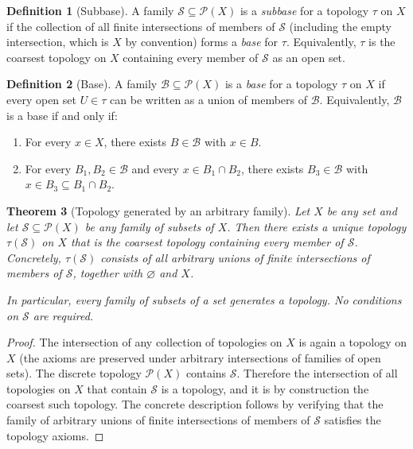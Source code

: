 \documentclass[11pt,a4paper]{article}
\theoremstyle{plain}
\newtheorem{theorem}{Theorem}[section]
\theoremstyle{definition}
\newtheorem{definition}[theorem]{Definition}
\newcommand{\powerset}{\mathcal{P}}
\newcommand{\subbase}{\mathcal{S}}
\newcommand{\base}{\mathcal{B}}
\begin{document}
\begin{definition}[Subbase]\label{def:subbase}
A family $\subbase \subseteq \powerset(X)$ is a \emph{subbase} for a topology
$\tau$ on $X$ if the collection of all finite intersections of members of
$\subbase$ (including the empty intersection, which is $X$ by convention)
forms a \emph{base} for $\tau$.  Equivalently, $\tau$ is the coarsest topology
on $X$ containing every member of $\subbase$ as an open set.
\end{definition}

\begin{definition}[Base]\label{def:base}
A family $\base \subseteq \powerset(X)$ is a \emph{base} for a topology $\tau$
on $X$ if every open set $U \in \tau$ can be written as a union of members of
$\base$.  Equivalently, $\base$ is a base if and only if:
\begin{enumerate}[label=(\roman*),nosep]
  \item For every $x \in X$, there exists $B \in \base$ with $x \in B$.
  \item For every $B_1, B_2 \in \base$ and every $x \in B_1 \cap B_2$, there
        exists $B_3 \in \base$ with $x \in B_3 \subseteq B_1 \cap B_2$.
\end{enumerate}
\end{definition}

\begin{theorem}[Topology generated by an arbitrary family]\label{thm:generated-topology}
Let $X$ be any set and let $\subbase \subseteq \powerset(X)$ be any family of
subsets of $X$.  Then there exists a unique topology $\tau(\subbase)$ on $X$
that is the coarsest topology containing every member of $\subbase$.
Concretely, $\tau(\subbase)$ consists of all arbitrary unions of finite
intersections of members of $\subbase$, together with $\varnothing$ and $X$.

In particular, \emph{every} family of subsets of a set generates a topology.
No conditions on $\subbase$ are required.
\end{theorem}

\begin{proof}
The intersection of any collection of topologies on $X$ is again a topology on
$X$ (the axioms are preserved under arbitrary intersections of families of open
sets).  The discrete topology $\powerset(X)$ contains $\subbase$.  Therefore
the intersection of all topologies on $X$ that contain $\subbase$ is a
topology, and it is by construction the coarsest such topology.  The concrete
description follows by verifying that the family of arbitrary unions of finite
intersections of members of $\subbase$ satisfies the topology axioms.
\end{proof}
\end{document}

